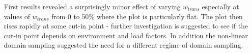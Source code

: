 First results revealed a surprisingly minor effect of varying $w_{trans}$ especially at values of $w_{trans}$ from 0 to 50\% where the plot is particularly flat. The plot then rises rapidly at some cut-in point - further investigation is suggested to see if the cut-in point depends on environment and load factors. In addition the non-linear domain sampling suggested the need for a different regime of domain sampling. 


\clearpage
\begin{figure}[h]
 \begin{center}
\end{center}
\end{figure}
